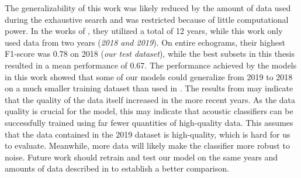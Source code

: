     
    The generalizability of this work was likely reduced by the amount of data used during the exhaustive search and was restricted because of little computational power. In the works of \citeauthor{brautaset2020acoustic}, they utilized a total of 12 years, while this work only used data from two years (\textit{2018 and 2019}). On entire echograms, their highest F1-score was 0.78 on 2018 (\textit{our test dataset}), while the best subsets in this thesis resulted in a mean performance of 0.67. The performance achieved by the models in this work showed that some of our models could generalize from 2019 to 2018 on a much smaller training dataset than used in \citet{brautaset2020acoustic}. The results from \citeauthor{brautaset2020acoustic} may indicate that the quality of the data itself increased in the more recent years. As the data quality is crucial for the model, this may indicate that acoustic classifiers can be successfully trained using far fewer quantities of high-quality data. This assumes that the data contained in the 2019 dataset is high-quality, which is hard for us to evaluate. Meanwhile, more data will likely make the classifier more robust to noise. Future work should retrain and test our model on the same years and amounts of data described in \citeauthor{brautaset2020acoustic} to establish a better comparison.  
    
